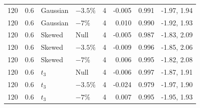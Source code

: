 \begin{table}[H]
\begin{tabular*}{\textwidth}{@{\extracolsep{\fill}}rrllrrrr}
120 & 0.6 & Gaussian & $-3.5\%$ & 4 & -0.005 & 0.991 & -1.97, 1.94 \\
120 & 0.6 & Gaussian & $-7\%$ & 4 & 0.010 & 0.990 & -1.92, 1.93 \\
120 & 0.6 & Skewed & Null & 4 & -0.005 & 0.987 & -1.83, 2.09 \\
120 & 0.6 & Skewed & $-3.5\%$ & 4 & -0.009 & 0.996 & -1.85, 2.06 \\
120 & 0.6 & Skewed & $-7\%$ & 4 & 0.006 & 0.995 & -1.82, 2.08 \\
120 & 0.6 & $t_3$ & Null & 4 & -0.006 & 0.997 & -1.87, 1.91 \\
120 & 0.6 & $t_3$ & $-3.5\%$ & 4 & -0.024 & 0.979 & -1.97, 1.90 \\
120 & 0.6 & $t_3$ & $-7\%$ & 4 & 0.007 & 0.995 & -1.95, 1.93 \\
\bottomrule
\end{tabular*}
\end{table}


